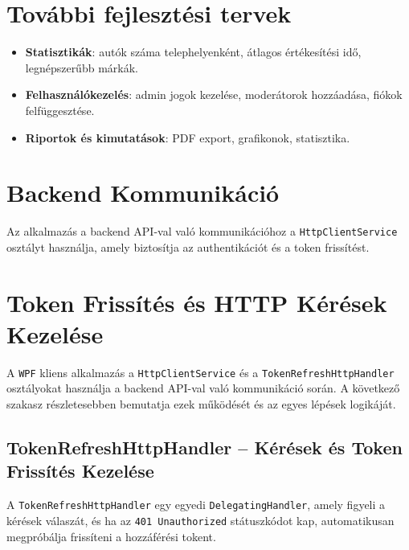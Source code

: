 \documentclass{report}[11pt]
\begin{document}
\section{További fejlesztési tervek}
\begin{itemize}
    \item \textbf{Statisztikák}: autók száma telephelyenként, átlagos értékesítési idő, legnépszerűbb márkák.
    \item \textbf{Felhasználókezelés}: admin jogok kezelése, moderátorok hozzáadása, fiókok felfüggesztése.
    \item \textbf{Riportok és kimutatások}: PDF export, grafikonok, statisztika.
\end{itemize}


\section{Backend Kommunikáció}
Az alkalmazás a backend API-val való kommunikációhoz a \texttt{HttpClientService} osztályt használja, amely biztosítja az authentikációt és a token frissítést.

\section{Token Frissítés és HTTP Kérések Kezelése}
A \texttt{WPF} kliens alkalmazás a \texttt{HttpClientService} és a \texttt{TokenRefreshHttpHandler} osztályokat használja a backend API-val való kommunikáció során. A következő szakasz részletesebben bemutatja ezek működését és az egyes lépések logikáját.

\subsection{TokenRefreshHttpHandler – Kérések és Token Frissítés Kezelése}
A \texttt{TokenRefreshHttpHandler} egy egyedi \texttt{DelegatingHandler}, amely figyeli a kérések válaszát, és ha az \texttt{401 Unauthorized} státuszkódot kap, automatikusan megpróbálja frissíteni a hozzáférési tokent.
\end{document}
